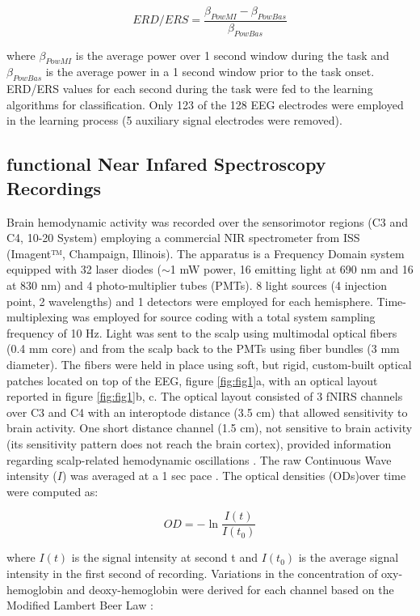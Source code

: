 \documentclass[12pt ]{iopart}
\begin{document}
\begin{equation}
\label{eqn:erders}
ERD/ERS=\frac{\beta_{PowMI}-\beta_{PowBas}}{\beta_{PowBas}}
\end{equation} 

where $\beta_{PowMI}$ is the average power over 1 second window during the task and $\beta_{PowBas}$ is the average power in a 1 second window prior to the task onset.
ERD/ERS values for each second during the task were fed to the learning algorithms for classification. Only 123 of the 128 EEG electrodes were employed in the learning process (5 auxiliary signal electrodes were removed).

\subsection{functional Near Infared Spectroscopy Recordings}
Brain hemodynamic activity was recorded over the sensorimotor regions (C3 and C4, 10-20 System) employing a commercial NIR spectrometer from ISS (Imagent™, Champaign, Illinois).
The apparatus is a Frequency Domain system equipped with 32 laser diodes ($\sim$1 mW  power, 16 emitting light at 690 nm and 16 at 830 nm) and 4 photo-multiplier tubes (PMTs). 
8 light sources (4 injection point, 2 wavelengths) and 1 detectors were employed for each hemisphere. Time-multiplexing was employed for source coding with a total system sampling frequency of 10 Hz.  Light was sent to the scalp using multimodal optical fibers (0.4 mm core) and from the scalp back to the PMTs using fiber bundles (3 mm diameter).  The fibers were held in place using soft, but rigid, custom-built optical patches located on top of the EEG, figure \ref{fig:fig1}a, with an optical layout reported in figure \ref{fig:fig1}b, c. The optical layout consisted of 3 fNIRS channels over C3 and C4 with an interoptode distance (3.5 cm) that allowed sensitivity to brain activity. One short distance channel (1.5 cm),  not sensitive to brain activity (its sensitivity pattern does not reach the brain cortex), provided information regarding scalp-related hemodynamic oscillations \parencite{gagnon2014further}.  
The raw Continuous Wave intensity ($I$)  was averaged  at a 1 sec pace .
The optical densities (ODs)over time were computed as:

\begin{equation}
\label{eqn:erders}
OD=-\ln\frac{I(t)}{I(t_{0})}
\end{equation} 

where $I(t)$ is the signal intensity at second t and $I(t_{0})$ is the average signal intensity in the first second of recording.
Variations in the concentration of oxy-hemoglobin and deoxy-hemoglobin were derived for each channel  based on the Modified Lambert Beer Law \parencite{sassaroli2004comment}:
\end{document}
